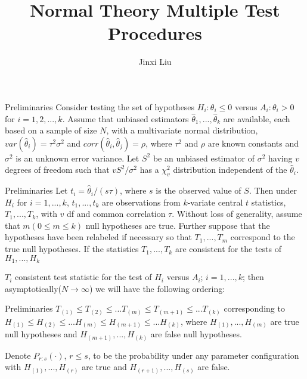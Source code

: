 \documentclass{beamer}
\title{Normal Theory Multiple Test Procedures}
\author{Jinxi Liu}
\begin{document}
	
\begin{frame}
	
	\titlepage
	
\end{frame}

\begin{frame}[t]{Preliminaries}\vspace{10pt}
Consider testing the set of hypotheses $H_i: \theta_i\leq0$ versus $A_i: \theta _i>0$ for $i=1,2,...,k$. Assume that unbiased estimators $\hat{\theta}_1,...,\hat{\theta}_k$ are available, each based on a sample of size $N$, with a multivariate normal distribution, $var(\hat{\theta}_i) = \tau^2\sigma^2$ and $corr(\hat{\theta}_i, \hat{\theta}_j)=\rho$, where $\tau^2$ and $\rho$ are known constants and $\sigma^2$ is an unknown error variance. Let $S^2$ be an unbiased estimator of $\sigma^2$ having $v$ degrees of freedom such that $vS^2/\sigma^2$ has a $\chi^2_v$ distribution independent of the $\hat{\theta}_i$.	
\end{frame}

\begin{frame}[t]{Preliminaries}\vspace{10pt}
Let $t_i = \hat{\theta}_i/(s\tau)$, where $s$ is the observed value of $S$. Then under $H_i$ for $i=1,...,k$, $t_1,...,t_k$ are observations from $k$-variate central $t$ statistics, $T_1,...,T_k$, with $v$ df and common correlation $\tau$.
Without loss of generality, assume that $m (0\leq m\leq k)$ null hypotheses are true. Further suppose that the hypotheses have been relabeled if necessary so that $T_1,...,T_m$ correspond to the true null hypotheses. If the statistics $T_1,...,T_k$ are consistent for the tests of $H_1,...,H_k$


$T_i$ consistent test statistic for the test of $H_i$ versus $A_i$; $i= 1,...,k$; then asymptotically($N\rightarrow \infty$) we will have the following ordering:


\end{frame}

\begin{frame}[t]{Preliminaries}\vspace{10pt}
$T_{(1)} \leq T_{(2)} \leq ...T_{(m)} \leq T_{(m+1)} \leq...T_{(k)}$ corresponding to $H_{(1)} \leq H_{(2)} \leq ...H_{(m)} \leq H_{(m+1)} \leq...H_{(k)}$, where $H_{(1)},...,H_{(m)}$ are true null hypotheses and $H_{(m+1)},...,H_{(k)}$ are false null hypotheses.

Denote $P_{r:s}(\cdot)$, $r\leq s$, to be the probability under any parameter configuration with $H_{(1)},...,H_{(r)}$ are true and $H_{(r+1)},...,H_{(s)}$ are false.
\end{frame}
\end{document}
